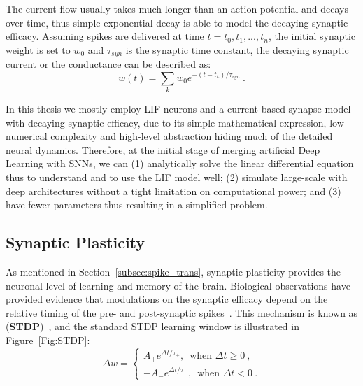 The current flow usually takes much longer than an action potential and decays over time, thus \DIFdelbegin {}\DIFdelend \DIFaddbegin {}\DIFaddend simple exponential decay is able to model the decaying synaptic efficacy.
Assuming spikes are delivered at time $t={t_0, t_1, ..., t_n}$, the initial synaptic weight is set to $w_0$ and $\tau_{syn}$ is the synaptic time constant, the decaying synaptic current or the conductance can be described as:
\begin{equation}
w(t) = \sum_k w_0 e^{-(t-t_k)/\tau_{syn}}~.
\end{equation}

In this thesis we mostly employ LIF neurons and a current-based synapse model with decaying synaptic efficacy, due to its simple mathematical expression, low numerical complexity and high-level abstraction hiding much of the detailed neural dynamics.
Therefore, at the initial stage of merging artificial Deep Learning with \DIFdelbegin {}\DIFdelend \DIFaddbegin {}\DIFaddend SNNs, we can (1) analytically solve the linear differential equation thus to understand and to use the LIF model well; (2) simulate large-scale \DIFdelbegin {}\DIFdelend \DIFaddbegin {}\DIFaddend with deep architectures without a tight limitation on computational power; and (3) have fewer parameters thus resulting in a simplified problem.


\subsection{Synaptic Plasticity}
\label{subsec:STDP}
As mentioned in Section~\ref{subsec:spike_trans}, synaptic plasticity provides the neuronal level of learning and \DIFaddbegin {}\DIFaddend memory of the brain.
Biological observations have provided evidence that modulations on the synaptic efficacy depend on the relative timing of the pre- and post-synaptic spikes~\DIFdelbegin {}\DIFdelend \DIFaddbegin {}\DIFaddend .
This mechanism is known as \DIFdelbegin {}\DIFdelend \DIFaddbegin {}\DIFaddend (\textbf{STDP})~\DIFdelbegin {}\DIFdelend \DIFaddbegin {}\DIFaddend , and the standard STDP learning window is illustrated in Figure~\ref{Fig:STDP}:
\begin{equation}
\Delta w = \left\{
\begin{aligned}
A_+ e^{\Delta t/\tau_+} \textrm{,~~when~} \Delta t \geq 0~, \\
-A_- e^{\Delta t/\tau_-} \textrm{,~~when~} \Delta t < 0~.
\end{aligned}
\right.
\label{equ:stdp}
\end{equation}

